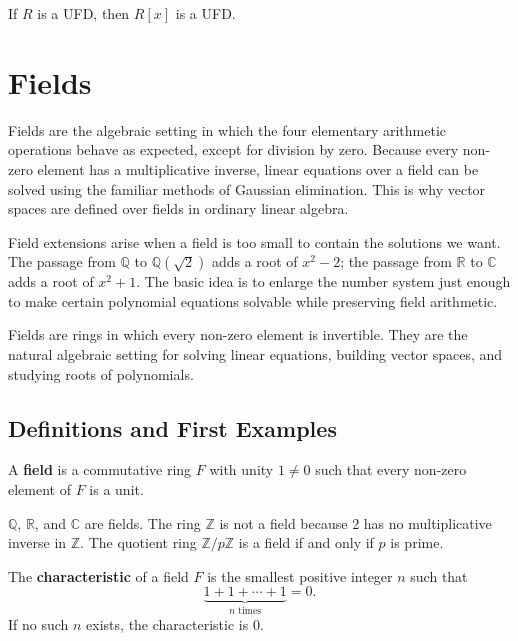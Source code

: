 \begin{theorem}
If $R$ is a UFD, then $R[x]$ is a UFD.
\end{theorem}

\section{Fields}


Fields are the algebraic setting in which the four elementary arithmetic operations behave as expected, except for division by zero. Because every non-zero element has a multiplicative inverse, linear equations over a field can be solved using the familiar methods of Gaussian elimination. This is why vector spaces are defined over fields in ordinary linear algebra.

Field extensions arise when a field is too small to contain the solutions we want. The passage from $\mathbb{Q}$ to $\mathbb{Q}(\sqrt{2})$ adds a root of $x^2-2$; the passage from $\mathbb{R}$ to $\mathbb{C}$ adds a root of $x^2+1$. The basic idea is to enlarge the number system just enough to make certain polynomial equations solvable while preserving field arithmetic.

Fields are rings in which every non-zero element is invertible. They are the natural algebraic setting for solving linear equations, building vector spaces, and studying roots of polynomials.

\subsection{Definitions and First Examples}

\begin{definition}[Field]
A \textbf{field} is a commutative ring $F$ with unity $1\neq 0$ such that every non-zero element of $F$ is a unit.
\end{definition}

\begin{example}
$\mathbb{Q}$, $\mathbb{R}$, and $\mathbb{C}$ are fields. The ring $\mathbb{Z}$ is not a field because $2$ has no multiplicative inverse in $\mathbb{Z}$. The quotient ring $\mathbb{Z}/p\mathbb{Z}$ is a field if and only if $p$ is prime.
\end{example}

\begin{definition}[Characteristic]
The \textbf{characteristic} of a field $F$ is the smallest positive integer $n$ such that
\[
    \underbrace{1+1+\cdots+1}_{n\text{ times}}=0.
\]
If no such $n$ exists, the characteristic is $0$.
\end{definition}


